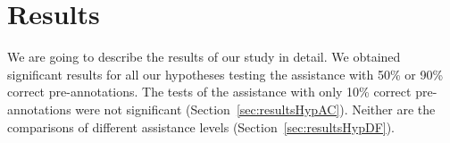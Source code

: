 \section{Results}
	\label{sec:results}
	We are going to describe the results of our study in detail. We obtained significant results for all our hypotheses testing the assistance with 50\% or 90\% correct pre-annotations. The tests of the assistance with only 10\% correct pre-annotations were not significant (Section~\ref{sec:resultsHypAC}). Neither are the comparisons of different assistance levels (Section~\ref{sec:resultsHypDF}).

	
	
	
